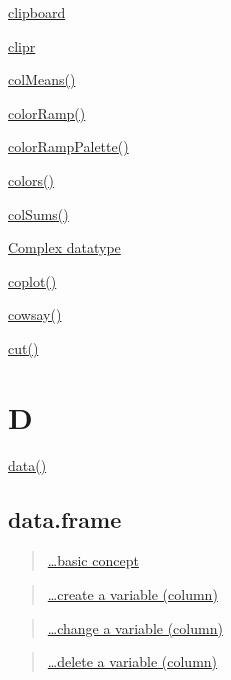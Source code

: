 \documentclass[]{book}
\begin{document}
\href{https://linkedin-learning.pxf.io/rweekly_clipboard}{clipboard}

\href{https://linkedin-learning.pxf.io/rweekly_clipboard}{clipr}

\href{https://linkedin-learning.pxf.io/rweekly_colmeans}{colMeans()}

\href{https://linkedin-learning.pxf.io/rwkly_colors}{colorRamp()}

\href{https://linkedin-learning.pxf.io/rwkly_colors}{colorRampPalette()}

\href{https://linkedin-learning.pxf.io/rwkly_colors}{colors()}

\href{https://linkedin-learning.pxf.io/rweekly_colmeans}{colSums()}

\href{https://linkedin-learning.pxf.io/rweekly_atomics}{Complex datatype}

\href{https://linkedin-learning.pxf.io/rweekly_coplot}{coplot()}

\href{https://linkedin-learning.pxf.io/rweekly_cowsay}{cowsay()}

\href{https://linkedin-learning.pxf.io/rweekly_cut}{cut()}

\hypertarget{d}{%
\chapter*{D}\label{d}}

\href{https://linkedin-learning.pxf.io/rwkly_dataSets}{data()}

\hypertarget{data.frame}{%
\section*{data.frame}\label{data.frame}}

\begin{quote}
\href{https://linkedin-learning.pxf.io/rweekly_dataframe}{\ldots{}basic concept}
\end{quote}

\begin{quote}
\href{https://linkedin-learning.pxf.io/data.frame_read_update}{\ldots{}create a variable (column)}
\end{quote}

\begin{quote}
\href{https://linkedin-learning.pxf.io/data.frame_read_update}{\ldots{}change a variable (column)}
\end{quote}

\begin{quote}
\href{https://linkedin-learning.pxf.io/data.frame_read_update}{\ldots{}delete a variable (column)}
\end{quote}
\end{document}
